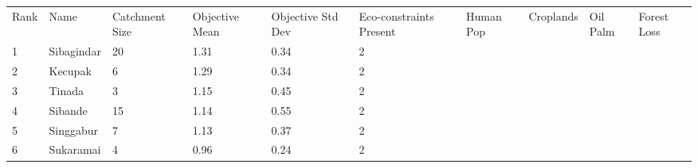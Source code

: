 \begin{table}[ht]
\centering
\begingroup\fontsize{8pt}{9pt}\selectfont
\begin{tabular}{C{0.03\textwidth}C{0.12\textwidth}C{0.09\textwidth}C{0.08\textwidth}C{0.08\textwidth}C{0.08\textwidth}C{0.07\textwidth}C{0.07\textwidth}C{0.07\textwidth}C{0.07\textwidth}}
 Rank & Name & Catchment Size & Objective Mean & Objective Std Dev & Eco-constraints  Present & Human Pop & Croplands & Oil Palm & Forest Loss \\ 
 {1} & Sibagindar &  20 & \textcolor[HTML]{FFFFFF}{1.31} & \textcolor[HTML]{000000}{0.34} & \textcolor[HTML]{000000}{2} &  &  &  &  \\ 
  {2} & Kecupak &   6 & \textcolor[HTML]{FFFFFF}{1.29} & \textcolor[HTML]{000000}{0.34} & \textcolor[HTML]{000000}{2} &  &  &  &  \\ 
  {3} & Tinada &   3 & \textcolor[HTML]{000000}{1.15} & \textcolor[HTML]{FFFFFF}{0.45} & \textcolor[HTML]{000000}{2} &  &  &  &  \\ 
  {4} & Sibande &  15 & \textcolor[HTML]{000000}{1.14} & \textcolor[HTML]{FFFFFF}{0.55} & \textcolor[HTML]{000000}{2} &  &  &  &  \\ 
  {5} & Singgabur &   7 & \textcolor[HTML]{000000}{1.13} & \textcolor[HTML]{000000}{0.37} & \textcolor[HTML]{000000}{2} &  &  &  &  \\ 
  {6} & Sukaramai &   4 & \textcolor[HTML]{000000}{0.96} & \textcolor[HTML]{000000}{0.24} & \textcolor[HTML]{000000}{2} &  &  &  &  \\ 

\end{tabular}
\end{table}
